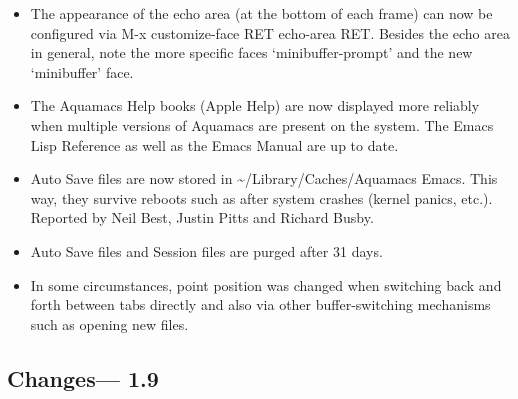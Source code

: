 \begin{itemize}
\item The appearance of the echo area (at the bottom of each frame) can now be configured via M-x customize-face RET echo-area RET.  Besides the echo area in general, note the more specific faces `minibuffer-prompt' and the new `minibuffer' face.

\item The Aquamacs Help books (Apple Help) are now displayed more reliably when multiple versions of Aquamacs are present on the system.  The Emacs Lisp Reference as well as the Emacs Manual are up to date.

\item Auto Save files are now stored in {\textasciitilde{}}/Library/Caches/Aquamacs Emacs.  This way, they survive reboots such as after system crashes (kernel panics, etc.).
Reported by Neil Best, Justin Pitts and Richard Busby.  %

\item Auto Save files and Session files are purged after 31 days. %

\item In some circumstances, point position was changed when switching back and forth between tabs directly and also via other buffer-switching mechanisms such as opening new files.  %


\end{itemize}

%
%
%


\subsection{Changes--- 1.9}

